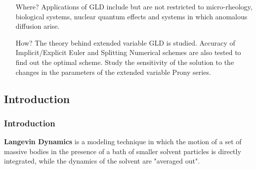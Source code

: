 \documentclass[a4paper,10pt]{beamer}
\begin{document}
	\begin{frame}
	\begin{itemize}
		\item[Where?]{Applications of GLD include but are not restricted to micro-rheology, biological systems, nuclear quantum effects and systems in which anomalous diffusion arise.}
		
		\item[How?]{The theory behind extended variable GLD is studied. Accuracy of Implicit/Explicit Euler and Splitting Numerical schemes are also tested to find out the optimal scheme. Study the sensitivity of the solution to the changes in the parameters of the extended variable Prony series.}
	\end{itemize}
	\end{frame}

	\begin{frame}
		\section{Introduction}
		\frametitle{Introduction}
		
		\quad \textbf{Langevin Dynamics} is a modeling technique in which the motion of a set of massive bodies in the presence of a bath of smaller solvent particles is directly integrated, while the dynamics of the solvent are "averaged out".
		

\end{frame}
\end{document}
